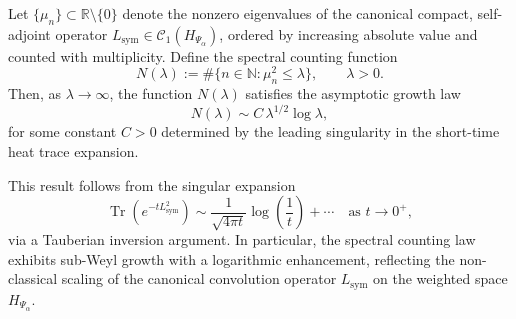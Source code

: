 \begin{proposition}
\label{prop:spectral-counting-weyl}
Let \( \{ \mu_n \} \subset \mathbb{R} \setminus \{0\} \) denote the nonzero eigenvalues of the canonical compact, self-adjoint operator \( L_{\mathrm{sym}} \in \mathcal{C}_1(H_{\Psi_\alpha}) \), ordered by increasing absolute value and counted with multiplicity. Define the spectral counting function
\[
N(\lambda) := \#\{ n \in \mathbb{N} : \mu_n^2 \leq \lambda \}, \qquad \lambda > 0.
\]
Then, as \( \lambda \to \infty \), the function \( N(\lambda) \) satisfies the asymptotic growth law
\[
N(\lambda) \sim C\, \lambda^{1/2} \log \lambda,
\]
for some constant \( C > 0 \) determined by the leading singularity in the short-time heat trace expansion.

\medskip
\noindent
This result follows from the singular expansion
\[
\operatorname{Tr}(e^{-t L_{\mathrm{sym}}^2}) \sim \frac{1}{\sqrt{4\pi t}} \log\left( \frac{1}{t} \right) + \cdots \quad \text{as } t \to 0^+,
\]
via a Tauberian inversion argument. In particular, the spectral counting law exhibits sub-Weyl growth with a logarithmic enhancement, reflecting the non-classical scaling of the canonical convolution operator \( L_{\mathrm{sym}} \) on the weighted space \( H_{\Psi_\alpha} \).
\end{proposition}
